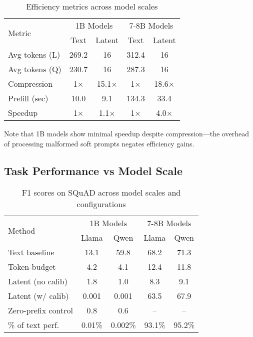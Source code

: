 \documentclass{article}
\begin{document}
\begin{table}[h]
\caption{Efficiency metrics across model scales}
\label{tab:efficiency_full}
\vskip 0.15in
\begin{center}
\begin{small}
\begin{tabular}{lcccc}
\toprule
\multirow{2}{*}{Metric} & \multicolumn{2}{c}{1B Models} & \multicolumn{2}{c}{7-8B Models} \\
& Text & Latent & Text & Latent \\
\midrule
Avg tokens (L) & 269.2 & 16 & 312.4 & 16 \\
Avg tokens (Q) & 230.7 & 16 & 287.3 & 16 \\
Compression & 1$\times$ & 15.1$\times$ & 1$\times$ & 18.6$\times$ \\
Prefill (sec) & 10.0 & 9.1 & 134.3 & 33.4 \\
Speedup & 1$\times$ & 1.1$\times$ & 1$\times$ & 4.0$\times$ \\
\bottomrule
\end{tabular}
\end{small}
\end{center}
\vskip -0.1in
\end{table}

Note that 1B models show minimal speedup despite compression—the overhead of processing malformed soft prompts negates efficiency gains.

\subsection{Task Performance vs Model Scale}

\begin{table}[h]
\caption{F1 scores on SQuAD across model scales and configurations}
\label{tab:f1_scale_extended}
\vskip 0.15in
\begin{center}
\begin{small}
\begin{tabular}{lcccc}
\toprule
\multirow{2}{*}{Method} & \multicolumn{2}{c}{1B Models} & \multicolumn{2}{c}{7-8B Models} \\
& Llama & Qwen & Llama & Qwen \\
\midrule
Text baseline & 13.1 & 59.8 & 68.2 & 71.3 \\
Token-budget & 4.2 & 4.1 & 12.4 & 11.8 \\
Latent (no calib) & 1.8 & 1.0 & 8.3 & 9.1 \\
Latent (w/ calib) & 0.001 & 0.001 & 63.5 & 67.9 \\
Zero-prefix control & 0.8 & 0.6 & -- & -- \\
\midrule
\% of text perf. & 0.01\% & 0.002\% & 93.1\% & 95.2\% \\
\bottomrule
\end{tabular}
\end{small}
\end{center}
\vskip -0.1in
\end{table}
\end{document}
